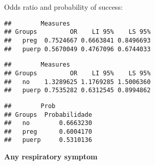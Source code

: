 \documentclass[
]{article}
\newenvironment{Shaded}{\begin{snugshade}}{\end{snugshade}}
\newcommand{\CommentTok}[1]{\textcolor[rgb]{0.56,0.35,0.01}{\textit{#1}}}
\newcommand{\KeywordTok}[1]{\textcolor[rgb]{0.13,0.29,0.53}{\textbf{#1}}}
\newcommand{\NormalTok}[1]{#1}
\newcommand{\OperatorTok}[1]{\textcolor[rgb]{0.81,0.36,0.00}{\textbf{#1}}}
\begin{document}
Odds ratio and probability of success:

\begin{Shaded}
\end{Shaded}

\begin{verbatim}
##        Measures
## Groups         OR    LI 95%    LS 95%
##   preg  0.7524667 0.6663841 0.8496693
##   puerp 0.5670049 0.4767096 0.6744033
\end{verbatim}

\begin{Shaded}
\end{Shaded}

\begin{verbatim}
##        Measures
## Groups         OR    LI 95%    LS 95%
##   no    1.3289625 1.1769285 1.5006360
##   puerp 0.7535282 0.6312545 0.8994862
\end{verbatim}

\begin{Shaded}
\end{Shaded}

\begin{verbatim}
##        Prob
## Groups  Probabilidade
##   no        0.6663230
##   preg      0.6004170
##   puerp     0.5310136
\end{verbatim}

\textbf{Any respiratory symptom}
\end{document}

